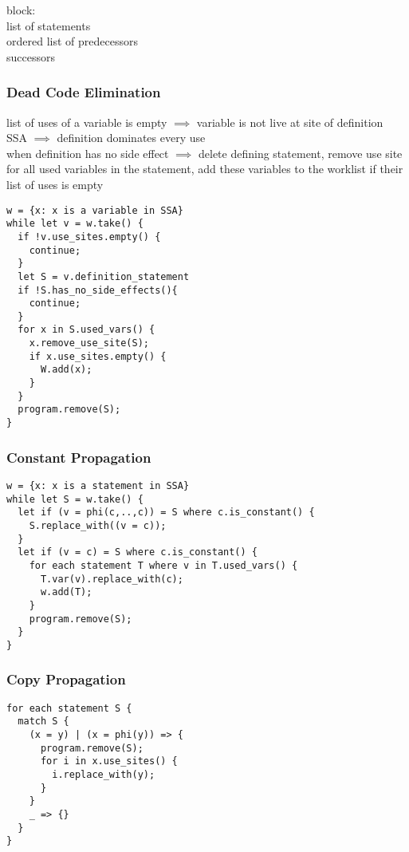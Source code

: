 \documentclass[8pt]{extarticle}
\begin{document}
\begin{multicols*}{2}
  block:\\
  list of statements\\
  ordered list of predecessors\\
  successors

  \subsubsection{Dead Code Elimination}
  
  list of uses of a variable is empty $\implies$ variable is not live at site of definition\\
  SSA $\implies$ definition dominates every use\\
  when definition has no side effect $\implies$ delete defining statement, remove use site for all used variables in the statement, add these variables to the worklist if their list of uses is empty

\begin{verbatim}
w = {x: x is a variable in SSA}
while let v = w.take() {
  if !v.use_sites.empty() {
    continue;
  }
  let S = v.definition_statement
  if !S.has_no_side_effects(){
    continue;
  }
  for x in S.used_vars() {
    x.remove_use_site(S);
    if x.use_sites.empty() {
      W.add(x);
    }
  }
  program.remove(S);
}
\end{verbatim}

  \subsubsection{Constant Propagation}

\begin{verbatim}
w = {x: x is a statement in SSA}
while let S = w.take() {
  let if (v = phi(c,..,c)) = S where c.is_constant() {
    S.replace_with((v = c));
  }
  let if (v = c) = S where c.is_constant() {
    for each statement T where v in T.used_vars() {
      T.var(v).replace_with(c);
      w.add(T);
    }
    program.remove(S);
  }
}
\end{verbatim}

  \subsubsection{Copy Propagation}

\begin{verbatim}
for each statement S {
  match S {
    (x = y) | (x = phi(y)) => {
      program.remove(S);
      for i in x.use_sites() {
        i.replace_with(y);
      }
    }
    _ => {}
  }
}
\end{verbatim}


\end{multicols*}
\end{document}
